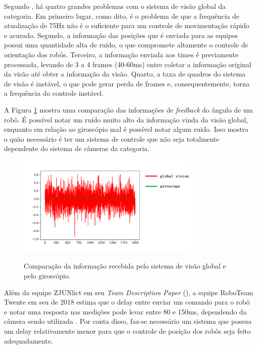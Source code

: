 \documentclass[acronym, symbols, table]{fei}
\begin{document}
			Segundo \textcite{tdpZJUNlict2020}, há quatro grandes problemas com o sistema de visão global da categoria. Em primeiro lugar, como dito, é o problema de que a frequência de atualização de 75Hz não é o suficiente para um controle de movimentação rápido e acurado. Segundo, a informação das posições que é enviada para as equipes possui uma quantidade alta de ruído, o que compromete altamente o controle de orientação dos robôs. Terceiro, a informação enviada aos times é previamente processada, levando de 3 a 4 frames (40-60ms) entre coletar a informação original da visão até obter a informação da visão. Quarto, a taxa de quadros do sistema de visão é instável, o que pode gerar perda de frames e, consequentemente, torna a frequência do controle instável.
			
			A Figura \ref{fig:comparison_cameras_gyroscope} mostra uma comparação das informações de \textit{feedback} do ângulo de um robô. É possível notar um ruído muito alto da informação vinda da visão global, enquanto em relação ao giroscópio mal é possível notar algum ruido. Isso mostra o quão necessário é ter um sistema de controle que não seja totalmente dependente do sistema de câmeras da categoria.
			
			\begin{figure}[!htb]
					\centering
					\caption{Comparação da informação recebida pelo sistema de visão global e pelo giroscópio.} 
					\includegraphics[width=0.8\textwidth]{Comparacao_cameras_giroscopio.png}
					\label{fig:comparison_cameras_gyroscope}
				\end{figure}
		
			Além da equipe ZJUNlict em seu \textit{Team Description Paper} (), a equipe RoboTeam Twente em seu  de 2018 estima que o delay entre enviar um comando para o robô e notar uma resposta nas medições pode levar entre 80 e 150ms, dependendo da câmera sendo utilizada \cite{tdptwente2018}. Por conta disso, faz-se necessário um sistema que possua um delay relativamente menor para que o controle de posição dos robôs seja feito adequadamente.
\end{document}

